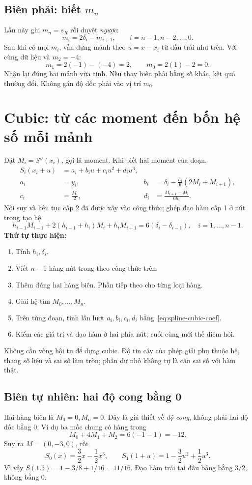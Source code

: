 \subsection{Biên phải: biết $m_n$}
\label{sec:spline-quadratic-right}
Lần này ghi $m_n=s_R$ rồi duyệt \emph{ngược}:
\[
\boxed{m_i=2\delta_i-m_{i+1},\qquad i=n-1,n-2,\ldots,0.}
\]
Sau khi có mọi $m_i$, vẫn dựng mảnh theo $u=x-x_i$ từ đầu trái như trên.
Với cùng dữ liệu và $m_2=-4$:
\[
m_1=2(-1)-(-4)=2,\qquad m_0=2(1)-2=0.
\]
Nhận lại đúng hai mảnh vừa tính. Nếu thay biên phải bằng số khác, kết quả thường đổi.
Không gán độ dốc phải vào vị trí $m_0$.

\section{Cubic: từ các moment đến bốn hệ số mỗi mảnh}
\label{sec:spline-cubic}
Đặt $M_i=S''(x_i)$, gọi là moment. Khi biết hai moment của đoạn,
\begin{align}
S_i(x_i+u)&=a_i+b_i u+c_i u^2+d_i u^3,\\
a_i&=y_i,&
b_i&=\delta_i-\frac{h_i}{6}(2M_i+M_{i+1}),\nonumber\\
c_i&=\frac{M_i}{2},&
d_i&=\frac{M_{i+1}-M_i}{6h_i}.\label{eq:spline-cubic-coef}
\end{align}
Nội suy và liên tục cấp 2 đã được xây vào công thức; ghép đạo hàm cấp 1 ở nút trong tạo hệ
\[
h_{i-1}M_{i-1}+2(h_{i-1}+h_i)M_i+h_iM_{i+1}
=6(\delta_i-\delta_{i-1}),\quad i=1,\ldots,n-1.
\]
\textbf{Thứ tự thực hiện:}
\begin{enumerate}
\item Tính $h_i,\delta_i$.
\item Viết $n-1$ hàng nút trong theo công thức trên.
\item Thêm đúng hai hàng biên. Phần tiếp theo cho từng loại hàng.
\item Giải hệ tìm $M_0,\ldots,M_n$.
\item Trên từng đoạn, tính lần lượt $a_i,b_i,c_i,d_i$ bằng~\eqref{eq:spline-cubic-coef}.
\item Kiểm các giá trị và đạo hàm ở hai phía nút; cuối cùng mới thế điểm hỏi.
\end{enumerate}
Không cần vòng hội tụ để dựng cubic. Độ tin cậy của phép giải phụ thuộc hệ, thang số liệu và sai số làm tròn; phần dư nhỏ không tự là cận sai số với hàm thật.

\subsection{Biên tự nhiên: hai độ cong bằng 0}
\label{sec:spline-natural}
Hai hàng biên là $M_0=0,M_n=0$. Đây là giả thiết về \emph{độ cong}, không phải hai độ dốc bằng 0.
Ví dụ ba mốc chung có hàng trong
\[
M_0+4M_1+M_2=6(-1-1)=-12.
\]
Suy ra $M=(0,-3,0)$, rồi
\[
S_0(x)=\frac32x-\frac12x^3,\qquad
S_1(1+u)=1-\frac32u^2+\frac12u^3.
\]
Vì vậy $S(1.5)=1-3/8+1/16=11/16$.
Đạo hàm trái tại đầu bảng bằng $3/2$, không bằng 0.


